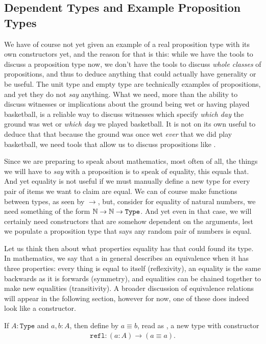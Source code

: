 \documentclass[11pt]{article}
\begin{document}
\subsection{Dependent Types and Example Proposition Types}

We have of course not yet given an example of a real proposition type with its own constructors yet, and the reason for that is this: while we have the tools to discuss a proposition type now, we don't have the tools to discuss \emph{whole classes} of propositions, and thus to deduce anything that could actually have generality or be useful. The unit type and empty type are technically examples of propositions, and yet they do not \emph{say} anything. What we need, more than the ability to discuss witnesses or implications about the ground being wet or having played basketball, is a reliable way to discuss witnesses which specify \emph{which day} the ground was wet or \emph{which day} we played basketball. It is not on its own useful to deduce that that because the ground was once wet \emph{ever} that we did play basketball, we need tools that allow us to discuss propositions like .

Since we are preparing to speak about mathematics, most often of all, the things we will have to \emph{say} with a proposition is to speak of equality, this equals that. And yet equality is not useful if we must manually define a new type for every pair of items we want to claim are equal. We can of course make functions between types, as seen by $\to$, but, consider for equality of natural numbers, we need something of the form $\mathbb{N} \to \mathbb{N} \to \mathtt{Type}$. And yet even in that case, we will certainly need constructors that are somehow dependent on the arguments, lest we populate a proposition type that says any random pair of numbers is equal.

Let us think then about what properties equality has that could found its type. In mathematics, we say that a  in general describes an equivalence when it has three properties: every thing is equal to itself (reflexivity), an equality is the same backwards as it is forwards (symmetry), and equalities can be chained together to make new equalities (transitivity). A broader discussion of equivalence relations will appear in the following section, however for now, one of these does indeed look like a constructor.

\begin{definition}
If $A \colon \mathtt{Type}$ and $a,b \colon A$, then define by $a \equiv b$, read as , a new type with constructor \begin{gather*}
\mathtt{refl} \colon (a \colon A) \to (a \equiv a).
\end{gather*}
\end{definition}
\end{document}
